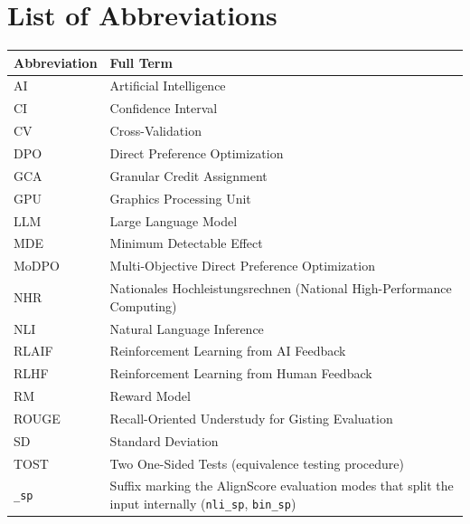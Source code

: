 
\chapter*{List of Abbreviations}

\begin{tabularx}{\textwidth}{@{}lX@{}}
\toprule
\textbf{Abbreviation} & \textbf{Full Term} \\
\midrule
AI               & Artificial Intelligence \\
CI               & Confidence Interval \\
CV               & Cross-Validation \\
DPO              & Direct Preference Optimization \\
GCA              & Granular Credit Assignment \\
GPU              & Graphics Processing Unit \\
LLM              & Large Language Model \\
MDE              & Minimum Detectable Effect \\
MoDPO            & Multi-Objective Direct Preference Optimization \\
NHR              & Nationales Hochleistungsrechnen (National High-Performance Computing) \\
NLI              & Natural Language Inference \\
RLAIF            & Reinforcement Learning from AI Feedback \\
RLHF             & Reinforcement Learning from Human Feedback \\
RM               & Reward Model \\
ROUGE            & Recall-Oriented Understudy for Gisting Evaluation \\
SD               & Standard Deviation \\
TOST             & Two One-Sided Tests (equivalence testing procedure) \\
\texttt{\_sp}    & Suffix marking the AlignScore evaluation modes that split the input
                   internally (\texttt{nli\_sp}, \texttt{bin\_sp}) \\
\bottomrule
\end{tabularx}
